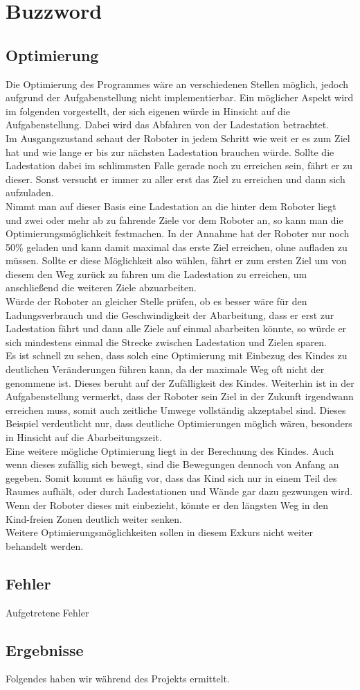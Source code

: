 \section{Buzzword}
\subsection{Optimierung}
Die Optimierung des Programmes wäre an verschiedenen Stellen möglich, jedoch aufgrund der Aufgabenstellung nicht implementierbar. Ein möglicher Aspekt wird im folgenden vorgestellt, der sich eigenen würde in Hinsicht auf die Aufgabenstellung. Dabei wird das Abfahren von der Ladestation betrachtet. \\
Im Ausgangszustand schaut der Roboter in jedem Schritt wie weit er es zum Ziel hat und wie lange er bis zur nächsten Ladestation brauchen würde. Sollte die Ladestation dabei im schlimmsten Falle gerade noch zu erreichen sein, fährt er zu dieser. Sonst versucht er immer zu aller erst das Ziel zu erreichen und dann sich aufzuladen. \\
Nimmt man auf dieser Basis eine Ladestation an die hinter dem Roboter liegt und zwei oder mehr ab zu fahrende Ziele vor dem Roboter an, so kann man die Optimierungsmöglichkeit festmachen. In der Annahme hat der Roboter nur noch 50\% geladen und kann damit maximal das erste Ziel erreichen, ohne aufladen zu müssen. Sollte er diese Möglichkeit also wählen, fährt er zum ersten Ziel um von diesem den Weg zurück zu fahren um die Ladestation zu erreichen, um anschließend die weiteren Ziele abzuarbeiten. \\
Würde der Roboter an gleicher Stelle prüfen, ob es besser wäre für den Ladungsverbrauch und die Geschwindigkeit der Abarbeitung, dass er erst zur Ladestation fährt und dann alle Ziele auf einmal abarbeiten könnte, so würde er sich mindestens einmal die Strecke zwischen Ladestation und Zielen sparen. \\
Es ist schnell zu sehen, dass solch eine Optimierung mit Einbezug des Kindes zu deutlichen Veränderungen führen kann, da der maximale Weg oft nicht der genommene ist. Dieses beruht auf der Zufälligkeit des Kindes. Weiterhin ist in der Aufgabenstellung vermerkt, dass der Roboter sein Ziel in der Zukunft irgendwann erreichen muss, somit auch zeitliche Umwege vollständig akzeptabel sind. Dieses Beispiel verdeutlicht nur, dass deutliche Optimierungen möglich wären, besonders in Hinsicht auf die Abarbeitungszeit. \\
Eine weitere mögliche Optimierung liegt in der Berechnung des Kindes. Auch wenn dieses zufällig sich bewegt, sind die Bewegungen dennoch von Anfang an gegeben. Somit kommt es häufig vor, dass das Kind sich nur in einem Teil des Raumes aufhält, oder durch Ladestationen und Wände gar dazu gezwungen wird. Wenn der Roboter dieses mit einbezieht, könnte er den längsten Weg in den Kind-freien Zonen deutlich weiter senken. \\
Weitere Optimierungsmöglichkeiten sollen in diesem Exkurs nicht weiter behandelt werden.
\subsection{Fehler}
Aufgetretene Fehler
\subsection{Ergebnisse}%
Folgendes haben wir während des Projekts ermittelt.%